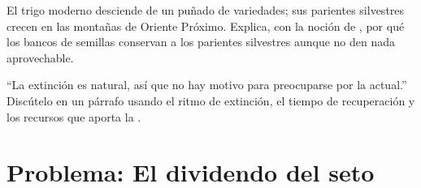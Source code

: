 \begin{exercise}[$\star\star\star$]\label{exo:g10:biodiversity-scales:14}
El trigo moderno desciende de un puñado de variedades; sus parientes
silvestres crecen en las montañas de Oriente Próximo. Explica, con la
noción de , por qué los bancos de semillas conservan
a los parientes silvestres aunque no den nada aprovechable.
\end{exercise}

\begin{exercise}[$\star\star\star$]\label{exo:g10:biodiversity-scales:15}
``La extinción es natural, así que no hay motivo para preocuparse por
la actual.'' Discútelo en un párrafo usando el ritmo de extinción, el
tiempo de recuperación y los recursos que aporta la .
\end{exercise}

\section{Problema: El dividendo del seto}

